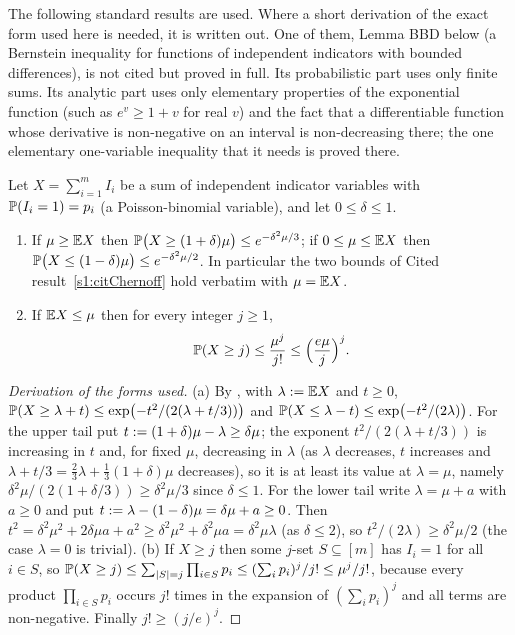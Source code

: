 The following standard results are used. Where a short derivation of the exact
form used here is needed, it is written out.
One of them, Lemma BBD below (a Bernstein inequality for functions of
independent indicators with bounded differences), is not cited but proved in
full. Its probabilistic part uses only finite sums. Its analytic part uses
only elementary properties of the exponential function (such as $e^v\ge1+v$
for real $v$) and the fact that a differentiable function whose derivative is
non-negative on an interval is non-decreasing there; the one elementary
one-variable inequality that it needs is proved there.

\begin{citedresult}\label{s1:citChernoffGen}
Let $X=\sum_{i=1}^mI_i$ be a sum of independent indicator variables with
$\mathbb{P}(I_i=1)=p_i$ (a Poisson-binomial variable), and let $0\le\delta\le1$.
\begin{enumerate}
\item[(a)] If $\mu\ge\mathbb{E} X$ then $\mathbb{P}\bigl(X\ge(1+\delta)\mu\bigr)\le
e^{-\delta^2\mu/3}$; if $0\le\mu\le\mathbb{E} X$ then $\mathbb{P}\bigl(X\le(1-\delta)\mu\bigr)
\le e^{-\delta^2\mu/2}$. In particular the two bounds of Cited
result~\ref{s1:citChernoff} hold verbatim with $\mu=\mathbb{E} X$.
\item[(b)] If $\mathbb{E} X\le\mu$ then for every integer $j\ge1$,
\[
\mathbb{P}(X\ge j)\le\frac{\mu^j}{j!}\le\Bigl(\frac{e\mu}{j}\Bigr)^j.
\]
\end{enumerate}
\end{citedresult}
\begin{proof}[Derivation of the forms used]
(a) By \cite[Theorems~2.1 and~2.8]{JLR00}, with $\lambda\mathrel{:=}\mathbb{E} X$ and $t\ge0$,
$\mathbb{P}(X\ge\lambda+t)\le\exp\bigl(-t^2/(2(\lambda+t/3))\bigr)$ and
$\mathbb{P}(X\le\lambda-t)\le\exp\bigl(-t^2/(2\lambda)\bigr)$. For the upper tail put
$t\mathrel{:=}(1+\delta)\mu-\lambda\ge\delta\mu$; the exponent
$t^2/(2(\lambda+t/3))$ is increasing in $t$ and, for fixed $\mu$, decreasing in
$\lambda$ (as $\lambda$ decreases, $t$ increases and
$\lambda+t/3=\frac23\lambda+\frac13(1+\delta)\mu$ decreases), so it is at least
its value at $\lambda=\mu$, namely $\delta^2\mu/(2(1+\delta/3))\ge\delta^2\mu/3$
since $\delta\le1$. For the lower tail write $\lambda=\mu+a$ with $a\ge0$ and
put $t\mathrel{:=}\lambda-(1-\delta)\mu=\delta\mu+a\ge0$. Then
$t^2=\delta^2\mu^2+2\delta\mu a+a^2\ge\delta^2\mu^2+\delta^2\mu a=\delta^2\mu\lambda$
(as $\delta\le2$), so $t^2/(2\lambda)\ge\delta^2\mu/2$ (the case $\lambda=0$ is
trivial).
(b) If $X\ge j$ then some $j$-set $S\subseteq[m]$ has $I_i=1$ for all $i\in S$,
so $\mathbb{P}(X\ge j)\le\sum_{|S|=j}\prod_{i\in S}p_i\le(\sum_ip_i)^j/j!\le\mu^j/j!$,
because every product $\prod_{i\in S}p_i$ occurs $j!$ times in the expansion of
$(\sum_ip_i)^j$ and all terms are non-negative. Finally $j!\ge(j/e)^j$.
\end{proof}

